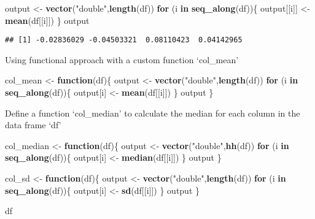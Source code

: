 \documentclass[
]{article}
\newenvironment{Shaded}{\begin{snugshade}}{\end{snugshade}}
\newcommand{\ControlFlowTok}[1]{\textcolor[rgb]{0.13,0.29,0.53}{\textbf{#1}}}
\newcommand{\FunctionTok}[1]{\textcolor[rgb]{0.13,0.29,0.53}{\textbf{#1}}}
\newcommand{\NormalTok}[1]{#1}
\newcommand{\OtherTok}[1]{\textcolor[rgb]{0.56,0.35,0.01}{#1}}
\newcommand{\StringTok}[1]{\textcolor[rgb]{0.31,0.60,0.02}{#1}}
\begin{document}
\begin{Shaded}
\begin{Highlighting}[]
\NormalTok{output }\OtherTok{\textless{}{-}} \FunctionTok{vector}\NormalTok{(}\StringTok{"double"}\NormalTok{,}\FunctionTok{length}\NormalTok{(df))}
\ControlFlowTok{for}\NormalTok{ (i }\ControlFlowTok{in} \FunctionTok{seq\_along}\NormalTok{(df))\{}
\NormalTok{  output[[i]] }\OtherTok{\textless{}{-}} \FunctionTok{mean}\NormalTok{(df[[i]])}
\NormalTok{\}}
\NormalTok{output}
\end{Highlighting}
\end{Shaded}

\begin{verbatim}
## [1] -0.02836029 -0.04503321  0.08110423  0.04142965
\end{verbatim}

Using functional approach with a custom function `col\_mean'

\begin{Shaded}
\begin{Highlighting}[]
\NormalTok{col\_mean }\OtherTok{\textless{}{-}} \ControlFlowTok{function}\NormalTok{(df)\{}
\NormalTok{  output }\OtherTok{\textless{}{-}} \FunctionTok{vector}\NormalTok{(}\StringTok{"double"}\NormalTok{,}\FunctionTok{length}\NormalTok{(df))}
  \ControlFlowTok{for}\NormalTok{ (i }\ControlFlowTok{in} \FunctionTok{seq\_along}\NormalTok{(df))\{}
\NormalTok{    output[i] }\OtherTok{\textless{}{-}} \FunctionTok{mean}\NormalTok{(df[[i]])}
\NormalTok{  \}}
\NormalTok{  output}
\NormalTok{\}}
\end{Highlighting}
\end{Shaded}

Define a function `col\_median' to calculate the median for each column
in the data frame `df'

\begin{Shaded}
\begin{Highlighting}[]
\NormalTok{col\_median }\OtherTok{\textless{}{-}} \ControlFlowTok{function}\NormalTok{(df)\{}
\NormalTok{  output }\OtherTok{\textless{}{-}} \FunctionTok{vector}\NormalTok{(}\StringTok{"double"}\NormalTok{,}\FunctionTok{hh}\NormalTok{(df))}
  \ControlFlowTok{for}\NormalTok{ (i }\ControlFlowTok{in} \FunctionTok{seq\_along}\NormalTok{(df))\{}
\NormalTok{    output[i] }\OtherTok{\textless{}{-}} \FunctionTok{median}\NormalTok{(df[[i]])}
\NormalTok{  \}}
\NormalTok{  output}
\NormalTok{\}}

\NormalTok{col\_sd }\OtherTok{\textless{}{-}} \ControlFlowTok{function}\NormalTok{(df)\{}
\NormalTok{  output }\OtherTok{\textless{}{-}} \FunctionTok{vector}\NormalTok{(}\StringTok{"double"}\NormalTok{,}\FunctionTok{length}\NormalTok{(df))}
  \ControlFlowTok{for}\NormalTok{ (i }\ControlFlowTok{in} \FunctionTok{seq\_along}\NormalTok{(df))\{}
\NormalTok{    output[i] }\OtherTok{\textless{}{-}} \FunctionTok{sd}\NormalTok{(df[[i]])}
\NormalTok{  \}}
\NormalTok{  output}
\NormalTok{\}}

\NormalTok{df}
\end{Highlighting}
\end{Shaded}
\end{document}
